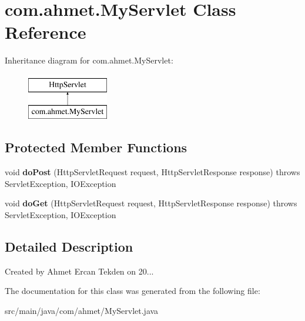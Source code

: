 \hypertarget{classcom_1_1ahmet_1_1_my_servlet}{}\section{com.\+ahmet.\+My\+Servlet Class Reference}
\label{classcom_1_1ahmet_1_1_my_servlet}
Inheritance diagram for com.\+ahmet.\+My\+Servlet\+:\begin{figure}[H]
\begin{center}
\leavevmode
\includegraphics[height=2.000000cm]{classcom_1_1ahmet_1_1_my_servlet}
\end{center}
\end{figure}
\subsection*{Protected Member Functions}
\begin{DoxyCompactItemize}
\item 
void {\bfseries do\+Post} (Http\+Servlet\+Request request, Http\+Servlet\+Response response)  throws Servlet\+Exception, I\+O\+Exception \hypertarget{classcom_1_1ahmet_1_1_my_servlet_ab8741db8d9ad6616215b2a721aff4306}{}\label{classcom_1_1ahmet_1_1_my_servlet_ab8741db8d9ad6616215b2a721aff4306}

\item 
void {\bfseries do\+Get} (Http\+Servlet\+Request request, Http\+Servlet\+Response response)  throws Servlet\+Exception, I\+O\+Exception \hypertarget{classcom_1_1ahmet_1_1_my_servlet_a912a8f77a78c9d08b8df1bbd3e4a20ec}{}\label{classcom_1_1ahmet_1_1_my_servlet_a912a8f77a78c9d08b8df1bbd3e4a20ec}

\end{DoxyCompactItemize}


\subsection{Detailed Description}
Created by Ahmet Ercan Tekden on 20... 

The documentation for this class was generated from the following file\+:\begin{DoxyCompactItemize}
\item 
src/main/java/com/ahmet/My\+Servlet.\+java\end{DoxyCompactItemize}

